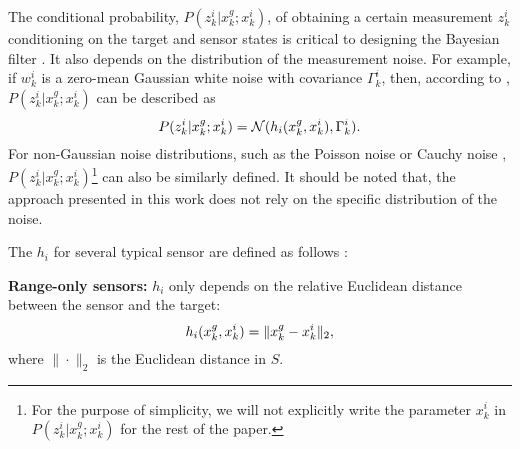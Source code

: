 	The conditional probability, $P(z^i_k|x^g_k;x^i_k)$, of obtaining a certain measurement $z^i_k$ conditioning on the target and sensor states is critical to designing the Bayesian filter \cite{thrun2005probabilistic}. 
	It also depends on the distribution of the measurement noise.
	For example, if $w^i_k$ is a zero-mean Gaussian white noise with covariance $\Gamma_k^i$, then, according to , $P(z^i_k|x^g_k;x^i_k)$ can be described as
	\small\begin{equation*}%
		P(z^i_k|x^g_k;x^i_k)=\mathcal{N}(h_i(\xg_k,x^i_k),\Gamma_k^i).
	\end{equation*}\normalsize
	For non-Gaussian noise distributions, such as the Poisson noise or Cauchy noise \cite{kitagawa1996monte}, $P(z^i_k|x^g_k;x^i_k)$\footnote{For the purpose of simplicity, we will not explicitly write the parameter $x^{i}_k$ in $P(z^i_k|x^g_k;x^i_k)$ for the rest of the paper.} can also be similarly defined.
	It should be noted that, the approach presented in this work does not rely on the specific distribution of the noise.
	
	The $h_i$ for several typical sensor are defined as follows \cite{bishop2010optimality}:
	
	\textbf{Range-only sensors:} 
	$h_i$ only depends on the relative Euclidean distance between the sensor and the target:
	\begin{equation*}%
		h_i(\xg_k,x^i_k)=\|\xg_k-x^i_k\|_2,
	\end{equation*}	
	where $\|\cdot\|_2$ is the Euclidean distance in $S$.
	
